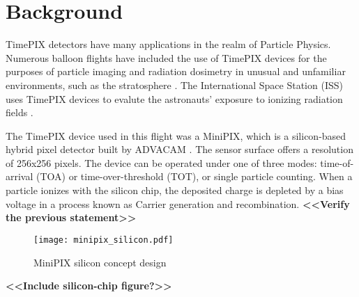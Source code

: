 
\section{Background}
\label{Background}

TimePIX detectors have many applications in the realm of Particle Physics. 
%
Numerous balloon flights have included the use of TimePIX devices for the purposes of particle imaging and radiation dosimetry in unusual and unfamiliar environments, such as the stratosphere \cite{bexus}. 
%
The International Space Station (ISS) uses TimePIX devices to evalute the astronauts' exposure to ionizing radiation fields \cite{timepixiss}.

The TimePIX device used in this flight was a MiniPIX, which is a silicon-based hybrid pixel detector built by ADVACAM \cite{advacam}. 
%
The sensor surface offers a resolution of 256x256 pixels.
%
The device can be operated under one of three modes: time-of-arrival (TOA) or time-over-threshold (TOT), or single particle counting. 
%
When a particle ionizes with the silicon chip, the deposited charge is depleted by a bias voltage in a process known as Carrier generation and recombination. \textbf{<<Verify the previous statement>>}

\begin{figure}[h]
    \centering
    \texttt{[image: minipix\_silicon.pdf]}
    \caption{MiniPIX silicon concept design}
    \label{fig:minipix_silicon}
\end{figure}
%

\textbf{<<Include silicon-chip figure?>>}
